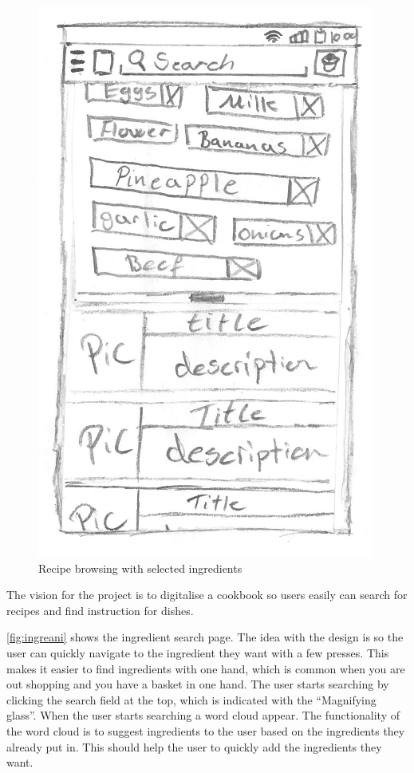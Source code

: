 \begin{figure}[H]
\begin{minipage}[b]{0.5\columnwidth}
\includegraphics[width=0.72\columnwidth]{../img/prototypes/recipe_browse2.pdf}
\caption{Recipe browsing with selected ingredients \label{fig:recipeword}}
\end{minipage}
\end{figure}

The vision for the project is to digitalise a cookbook so users easily can search for recipes and find instruction for dishes. 

\autoref{fig:ingreani} shows the ingredient search page. The idea with the design is so the user can quickly navigate to the ingredient they want with a few presses. This makes it easier to find ingredients with one hand, which is common when you are out shopping and you have a basket in one hand. The user starts searching by clicking the search field at the top, which is indicated with the ``Magnifying glass''. When the user starts searching a word cloud appear. The functionality of the word cloud is to suggest ingredients to the user based on the ingredients they already put in. This should help the user to quickly add the ingredients they want. 

